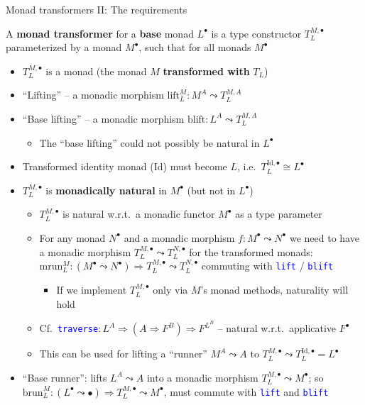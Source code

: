\documentclass[english]{beamer}
\begin{document}
\begin{frame}{Monad transformers II: The requirements}

{\footnotesize{}\vspace{-0.25cm}}A \textbf{monad transformer} for
a \textbf{base} monad $L^{\bullet}$ is a type constructor $T_{L}^{M,\bullet}$
parameterized by a monad $M^{\bullet}$, such that for all monads
$M^{\bullet}$
\begin{itemize}
\item $T_{L}^{M,\bullet}$ is a monad (the monad $M$ \textbf{transformed
with} $T_{L}$)
\item ``Lifting'' -- a monadic morphism $\text{lift}_{L}^{M}:M^{A}\leadsto T_{L}^{M,A}$
\item ``Base lifting'' -- a monadic morphism $\text{blift}:L^{A}\leadsto T_{L}^{M,A}$
\begin{itemize}
\item The ``base lifting'' could not possibly be natural in $L^{\bullet}$
\end{itemize}
\item Transformed identity monad ($\text{Id}$) must become $L$, i.e.~$T_{L}^{\text{Id},\bullet}\cong L^{\bullet}$
\item $T_{L}^{M,\bullet}$ is \textbf{monadically natural} in $M^{\bullet}$
(but not in $L^{\bullet}$)
\begin{itemize}
\item $T_{L}^{M,\bullet}$ is natural w.r.t.~a monadic functor $M^{\bullet}$
as a type parameter
\item For any monad $N^{\bullet}$ and a monadic morphism $f:M^{\bullet}\leadsto N^{\bullet}$
we need to have a monadic morphism $T_{L}^{M,\bullet}\leadsto T_{L}^{N,\bullet}$
for the transformed monads: $\text{mrun}_{L}^{M}:\left(M^{\bullet}\leadsto N^{\bullet}\right)\Rightarrow T_{L}^{M,\bullet}\leadsto T_{L}^{N,\bullet}$
commuting with \texttt{\textcolor{blue}{\footnotesize{}lift}} / \texttt{\textcolor{blue}{\footnotesize{}blift}} 
\begin{itemize}
\item If we implement $T_{L}^{M,\bullet}$ only via $M$'s monad methods,
naturality will hold 
\end{itemize}
\item Cf.~\texttt{\textcolor{blue}{\footnotesize{}traverse}}{\small{}$:L^{A}\Rightarrow\left(A\Rightarrow F^{B}\right)\Rightarrow F^{L^{B}}$
-- natural w.r.t.~applicative $F^{\bullet}$}{\small\par}
\item This can be used for lifting a ``runner'' $M^{A}\leadsto A$ to
$T_{L}^{M,\bullet}\leadsto T_{L}^{\text{Id},\bullet}=L^{\bullet}$
\end{itemize}
\item ``Base runner'': lifts $L^{A}\leadsto A$ into a monadic morphism
$T_{L}^{M,\bullet}\leadsto M^{\bullet}$; so $\text{brun}_{L}^{M}:\left(L^{\bullet}\leadsto\bullet\right)\Rightarrow T_{L}^{M,\bullet}\leadsto M^{\bullet}$,
must commute with \texttt{\textcolor{blue}{\footnotesize{}lift}} and
\texttt{\textcolor{blue}{\footnotesize{}blift}} 
\end{itemize}
\end{frame}
\end{document}
